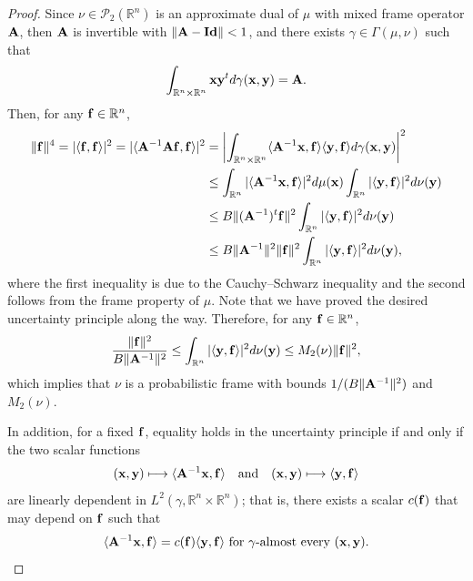 \documentclass[10pt,a4paper]{amsart}
\newcommand{\bA}{{\bf A}}
\newcommand{\bI}{{\bf Id}}
\newcommand{\norm}[1]{\left\Vert#1\right\Vert}
\begin{document}
\begin{proof}
 Since $\nu \in \mathcal{P}_2(\mathbb{R}^n)$ is an approximate dual of $\mu$ with mixed frame operator $\bf A$, then  $\bf A$ is invertible with $\norm{\bA - \bI}<1$, and there exists $\gamma \in \Gamma(\mu, \nu)$ such that 
   $$   \int_{\mathbb{R}^n \times \mathbb{R}^n} {\bf x} {\bf y}^t d\gamma({\bf x, y}) = {\bf A}.$$
   Then, for any ${\bf f} \in \mathbb{R}^n$, 
   \begin{equation*}
   \begin{split}
       \|{\bf f}\|^4 = |\langle {\bf f}, {\bf f} \rangle|^2 = |\langle {\bf A}^{-1}{\bf A}{\bf f}, {\bf f} \rangle|^2 &= \left|\int_{\mathbb{R}^n \times \mathbb{R}^n} \langle {\bf A}^{-1} {\bf x}, {\bf f} \rangle \langle {\bf y,f} \rangle d\gamma({\bf x, y}) \right |^2 \\
       & \leq \int_{\mathbb{R}^n} |\langle {\bf A }^{-1} {\bf x}, {\bf f} \rangle |^2 d\mu({\bf x}) \int_{\mathbb{R}^n} |\langle {\bf y}, {\bf f} \rangle |^2 d\nu({\bf y}) \\
       & \leq B \|({\bf A }^{-1})^t {\bf f}\|^2 \int_{\mathbb{R}^n} |\langle {\bf y}, {\bf f} \rangle |^2 d\nu({\bf y}) \\
       &\leq B\|{\bf A }^{-1}\|^2 \| {\bf f}\|^2 \int_{\mathbb{R}^n} |\langle {\bf y}, {\bf f} \rangle |^2 d\nu({\bf y}),
   \end{split}
   \end{equation*}
where the first inequality is due to the Cauchy–Schwarz inequality and the second follows from the frame property of $\mu$. Note that we have proved the desired uncertainty principle along the way. Therefore, for any ${\bf f} \in \mathbb{R}^n$,
\begin{equation*}
       \frac{\|{\bf f}\|^2}{B \|{\bf A }^{-1}\|^2}
       \leq  \int_{\mathbb{R}^n} |\langle {\bf y}, {\bf f} \rangle |^2 d\nu({\bf y}) \leq M_2(\nu)\|{\bf f}\|^2,
   \end{equation*}
 which implies that $\nu$ is a probabilistic frame with bounds $ 1/(B \| {\bf A}^{-1}\|^2)$ and $M_2(\nu)$. 

In addition, for a fixed ${\bf f}$, equality holds in the uncertainty principle if and only if the two scalar functions
\[
({\bf x},{\bf y})\longmapsto \langle {\bf A}^{-1}{\bf x},{\bf f}\rangle
\quad\text{and}\quad
({\bf x},{\bf y})\longmapsto \langle {\bf y},{\bf f}\rangle
\]
are linearly dependent in $L^{2}(\gamma, \mathbb{R}^n \times \mathbb{R}^n)$; that is, there exists a scalar
$c({\bf f})$ that may depend on ${\bf f}$ such that
\begin{equation}\label{eq:inner product ae}
\langle {\bf A}^{-1}{\bf x},{\bf f}\rangle
= c({\bf f}) \langle {\bf y},{\bf f}\rangle
\ \text{for $\gamma$-almost every }({\bf x},{\bf y}).
\end{equation}


\end{proof}
\end{document}

